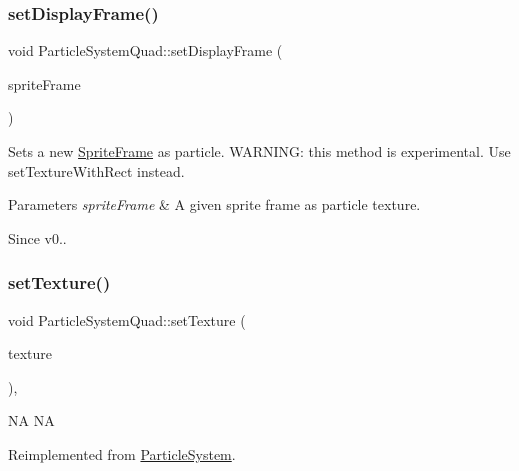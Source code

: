 \subsubsection{\texorpdfstring{set\+Display\+Frame()}{setDisplayFrame()}\hspace{0.1cm}{\footnotesize\ttfamily [2/2]}}
{\footnotesize\ttfamily void Particle\+System\+Quad\+::set\+Display\+Frame (\begin{DoxyParamCaption}\item[{\hyperlink{classSpriteFrame}{Sprite\+Frame} $\ast$}]{sprite\+Frame }\end{DoxyParamCaption})}

Sets a new \hyperlink{classSpriteFrame}{Sprite\+Frame} as particle. W\+A\+R\+N\+I\+NG\+: this method is experimental. Use set\+Texture\+With\+Rect instead.


\begin{DoxyParams}{Parameters}
{\em sprite\+Frame} & A given sprite frame as particle texture. \\
\hline
\end{DoxyParams}
\begin{DoxySince}{Since}
v0.. 
\end{DoxySince}
\mbox{\label{classParticleSystemQuad_aca7c2f7c82f41ef6d619506e8a9fe152}} 
\subsubsection{\texorpdfstring{set\+Texture()}{setTexture()}\hspace{0.1cm}{\footnotesize\ttfamily [1/2]}}
{\footnotesize\ttfamily void Particle\+System\+Quad\+::set\+Texture (\begin{DoxyParamCaption}\item[{\hyperlink{classTexture2D}{Texture2D} $\ast$}]{texture }\end{DoxyParamCaption})\hspace{0.3cm}{\ttfamily [override]}, {\ttfamily [virtual]}}

NA  NA 

Reimplemented from \hyperlink{classParticleSystem}{Particle\+System}.

\mbox{\label{classParticleSystemQuad_a40208d3483849c4855d4132232b4bb8c}} 
